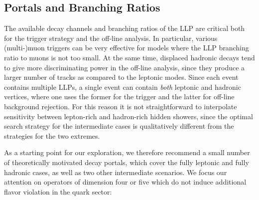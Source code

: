 \subsection{Portals and Branching Ratios}
\label{sec:darkshowerportal}

The available decay channels and branching ratios of the LLP are critical both for the trigger strategy and the off-line analysis. In particular, various (multi-)muon triggers can be very effective for models where the LLP branching ratio to muons is not too small. At the same time, displaced hadronic decays tend to give more discriminating power in the off-line analysis, since they produce a larger number of tracks as compared to the leptonic modes. Since each event contains multiple LLPs, a single event can contain \emph{both} leptonic and hadronic vertices, where one uses the former for the trigger and the latter for off-line background rejection. For this reason it is not straightforward to interpolate sensitivity between lepton-rich and hadron-rich hidden showers, since the optimal search strategy for the intermediate cases is qualitatively different from the strategies for the two extremes.

As a starting point for our exploration, we therefore recommend a small number of theoretically motivated decay portals, which cover the fully leptonic and fully hadronic cases, as well as two other intermediate scenarios. We focus our attention on operators of dimension four or five which do not induce additional flavor violation in the quark sector:

